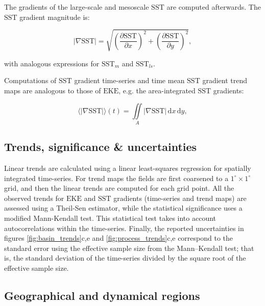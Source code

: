 \documentclass{nature}
\newcommand{\EKE}{\text{EKE}}
\newcommand{\SST}{\text{SST}}
\begin{document}
The gradients of the large-scale and mesoscale $\SST$ are computed afterwards. The $\SST$ gradient magnitude is:
\begin{linenomath*}
\begin{equation}
    \left|\nabla \SST \right| = \sqrt{ \left(\frac{\partial \SST}{\partial x}\right)^2 + \left(\frac{\partial \SST}{\partial y}\right)^2 },
\end{equation}
\end{linenomath*}
with analogous expressions for $\SST_m$ and $\SST_{ls}$. 

Computations of $\SST$ gradient time-series and time mean $\SST$ gradient trend maps are analogous to those of $\EKE$, e.g. the area-integrated $\SST$ gradients:
\begin{linenomath*}
\begin{equation}
	\langle\left|\nabla \SST \right|\rangle(t) = \iint\limits_A \left|\nabla \SST \right| \, \mathrm{d}x\,\mathrm{d}y,
\end{equation}
\end{linenomath*}


\subsection{Trends, significance \& uncertainties}\mbox{}\vspace{-1.5em}

Linear trends are calculated using a linear least-squares regression for spatially integrated time-series. For trend maps the fields are first coarsened to a $1^\circ\times1^\circ$ grid, and then the linear trends are computed for each grid point. All the observed trends for $\EKE$ and $\SST$ gradients (time-series and trend maps) are assessed using a Theil-Sen estimator, while the statistical significance uses a modified Mann-Kendall test\cite{Sheng_MK_2004}. This statistical test takes into account autocorrelations within the time-series. Finally, the reported uncertainties in figures \ref{fig:basin_trends}c,e and \ref{fig:process_trends}c,e correspond to the standard error using the effective sample size from the Mann--Kendall test; that is, the standard deviation of the time-series divided by the square root of the effective sample size.

\subsection{Geographical and dynamical regions}\mbox{}\vspace{-1.5em}
\end{document}

